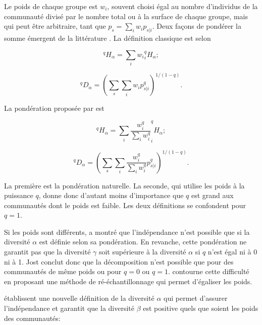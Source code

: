 \documentclass[
  11pt,
  french,
  a4paper,
  extrafontsizes,onecolumn,openright
  ]{memoir}
\newlength{\rf}
\begin{document}
Le poids de chaque groupe est \(w_i\), souvent choisi égal au nombre d'individus de la communauté divisé par le nombre total ou à la surface de chaque groupe, mais qui peut être arbitraire, tant que \(p_s=\sum_i{w_i p_{s|i}}\).
Deux façons de pondérer la somme émergent de la littérature \autocite{Chao2012a}.
La définition classique est selon \textcite{Routledge1979}

\begin{equation}
  \label{eq:RoutledgeHalpha}
  ^{q}\!H_{\alpha} = \sum_i{w_i {^{q}_{i}\!H_{\alpha}}};
\end{equation}

\begin{equation}
  \label{eq:RoutledgeDalpha}
  ^{q}\!D_{\alpha}={\left(\sum_s{\sum_i{w_i p^q_{s|i}}}\right)}^{1/{\left(1-q\right)}}.
\end{equation}

La pondération proposée par \textcite{Jost2007} est

\begin{equation}
  \label{eq:JostHalpha}
  ^{q}\!H_{\alpha} = \sum_i{\frac{w^q_i}{\sum_i{w^q_i}} ^{q}_{i}\!H_{\alpha}};
\end{equation}

\begin{equation}
  \label{eq:JostDalpha}
  ^{q}\!D_{\alpha} = {\left(\sum_s{\sum_i{\frac{w^q_i}{\sum_i{w^q_i}}p^q_{s|i}}}\right)}^{{1}/{\left(1-q\right)}}.
\end{equation}

La première est la pondération naturelle.
La seconde, qui utilise les poids à la puissance \(q\), donne donc d'autant moins d'importance que \(q\) est grand aux communautés dont le poids est faible.
Les deux définitions se confondent pour \(q=1\).

Si les poids sont différents, \textcite{Jost2007} a montré que l'indépendance n'est possible que si la diversité \(\alpha\) est définie selon sa pondération.
En revanche, cette pondération ne garantit pas que la diversité \(\gamma\) soit supérieure à la diversité \(\alpha\) si \(q\) n'est égal ni à 0 ni à 1.
Jost conclut donc que la décomposition n'est possible que pour des communautés de même poids ou pour \(q=0\) ou \(q=1\).
\textcite{Ricotta2009b} contourne cette difficulté en proposant une méthode de ré-échantillonnage qui permet d'égaliser les poids.

\textcite{Chiu2014} établissent une nouvelle définition de la diversité \(\alpha\) qui permet d'assurer l'indépendance et garantit que la diversité \(\beta\) est positive quels que soient les poids des communautés:
\end{document}
